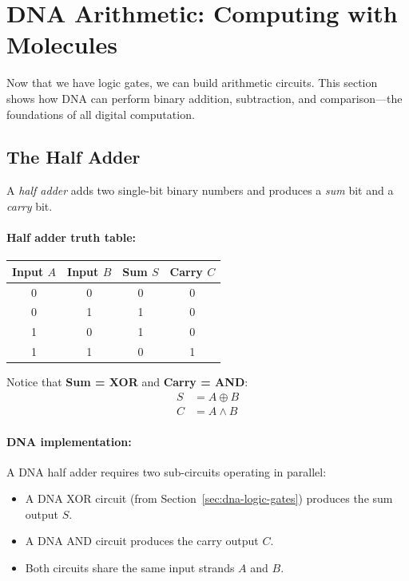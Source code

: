 \section{DNA Arithmetic: Computing with Molecules}
\label{sec:dna-arithmetic}

Now that we have logic gates, we can build arithmetic circuits. This section shows how DNA can perform binary addition, subtraction, and comparison---the foundations of all digital computation.

\subsection{The Half Adder}

A \emph{half adder} adds two single-bit binary numbers and produces a \emph{sum} bit and a \emph{carry} bit.

\paragraph{Half adder truth table:}
\begin{center}
\renewcommand{\arraystretch}{1.15}
\begin{tabular}{cc|cc}
\toprule
\textbf{Input $A$} & \textbf{Input $B$} & \textbf{Sum $S$} & \textbf{Carry $C$} \\
\midrule
0 & 0 & 0 & 0 \\
0 & 1 & 1 & 0 \\
1 & 0 & 1 & 0 \\
1 & 1 & 0 & 1 \\
\bottomrule
\end{tabular}
\end{center}

Notice that \textbf{Sum = XOR} and \textbf{Carry = AND}:
\begin{align}
S &= A \oplus B \label{eq:half-add-sum} \\
C &= A \wedge B \label{eq:half-add-carry}
\end{align}

\paragraph{DNA implementation:}
A DNA half adder requires two sub-circuits operating in parallel:
\begin{itemize}[leftmargin=1.8em]
  \item A DNA XOR circuit (from Section~\ref{sec:dna-logic-gates}) produces the sum output $S$.
  \item A DNA AND circuit produces the carry output $C$.
  \item Both circuits share the same input strands $A$ and $B$.
\end{itemize}

